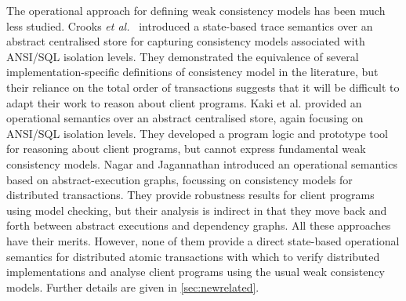 The operational approach for defining weak consistency models has been
much less studied.  Crooks {\em et al.}~\citet{seebelieve} introduced
a {state-based} trace semantics over an abstract centralised store for
capturing consistency models associated with ANSI/SQL isolation levels.
They demonstrated the equivalence of several implementation-specific
definitions of consistency model in the literature, but their reliance
on the total order of transactions suggests that it will be difficult
to adapt their work to reason about client programs. 
Kaki et al. \citet{alonetogether} provided an operational semantics
over an abstract centralised store, again focusing on ANSI/SQL
isolation levels. They developed a program logic and prototype tool for
reasoning about client programs,
but cannot express fundamental weak consistency models.
Nagar and Jagannathan \cite{sureshConcur} introduced an operational
semantics based on  
abstract-execution graphs, focussing on consistency models for
distributed transactions. They  provide
robustness results for  client programs using model checking, 
but their analysis is indirect in that they move back and forth
between abstract executions and dependency graphs. All these approaches have their merits. However, none of them provide a direct
state-based operational semantics for distributed atomic transactions
with which to verify  distributed
implementations and analyse  client programs using   the
usual 
weak
consistency models. 
Further details are given in \cref{sec:newrelated}.



